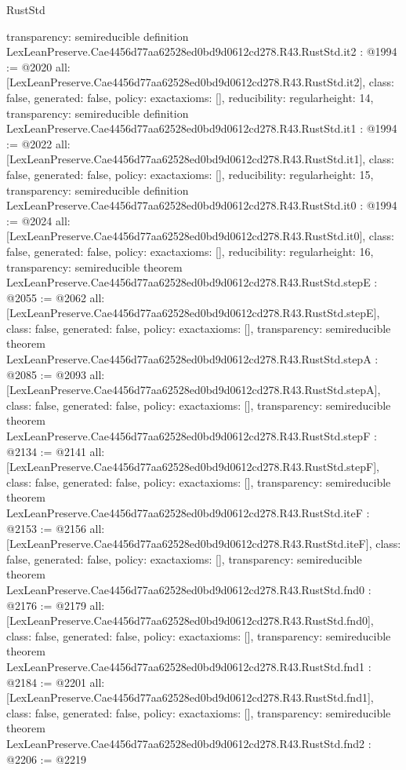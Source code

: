 \begin{lexlean}{RustStd}
\begin{coremodule}
{  transparency: semireducible
}
definition LexLeanPreserve.Cae4456d77aa62528ed0bd9d0612cd278.R43.RustStd.it2 : @1994 := @2020 {
  all: [LexLeanPreserve.Cae4456d77aa62528ed0bd9d0612cd278.R43.RustStd.it2],
  class: false,
  generated: false,
  policy: exact{axioms: []},
  reducibility: regular{height: 14},
  transparency: semireducible
}
definition LexLeanPreserve.Cae4456d77aa62528ed0bd9d0612cd278.R43.RustStd.it1 : @1994 := @2022 {
  all: [LexLeanPreserve.Cae4456d77aa62528ed0bd9d0612cd278.R43.RustStd.it1],
  class: false,
  generated: false,
  policy: exact{axioms: []},
  reducibility: regular{height: 15},
  transparency: semireducible
}
definition LexLeanPreserve.Cae4456d77aa62528ed0bd9d0612cd278.R43.RustStd.it0 : @1994 := @2024 {
  all: [LexLeanPreserve.Cae4456d77aa62528ed0bd9d0612cd278.R43.RustStd.it0],
  class: false,
  generated: false,
  policy: exact{axioms: []},
  reducibility: regular{height: 16},
  transparency: semireducible
}
theorem LexLeanPreserve.Cae4456d77aa62528ed0bd9d0612cd278.R43.RustStd.stepE : @2055 := @2062 {
  all: [LexLeanPreserve.Cae4456d77aa62528ed0bd9d0612cd278.R43.RustStd.stepE],
  class: false,
  generated: false,
  policy: exact{axioms: []},
  transparency: semireducible
}
theorem LexLeanPreserve.Cae4456d77aa62528ed0bd9d0612cd278.R43.RustStd.stepA : @2085 := @2093 {
  all: [LexLeanPreserve.Cae4456d77aa62528ed0bd9d0612cd278.R43.RustStd.stepA],
  class: false,
  generated: false,
  policy: exact{axioms: []},
  transparency: semireducible
}
theorem LexLeanPreserve.Cae4456d77aa62528ed0bd9d0612cd278.R43.RustStd.stepF : @2134 := @2141 {
  all: [LexLeanPreserve.Cae4456d77aa62528ed0bd9d0612cd278.R43.RustStd.stepF],
  class: false,
  generated: false,
  policy: exact{axioms: []},
  transparency: semireducible
}
theorem LexLeanPreserve.Cae4456d77aa62528ed0bd9d0612cd278.R43.RustStd.iteF : @2153 := @2156 {
  all: [LexLeanPreserve.Cae4456d77aa62528ed0bd9d0612cd278.R43.RustStd.iteF],
  class: false,
  generated: false,
  policy: exact{axioms: []},
  transparency: semireducible
}
theorem LexLeanPreserve.Cae4456d77aa62528ed0bd9d0612cd278.R43.RustStd.fnd0 : @2176 := @2179 {
  all: [LexLeanPreserve.Cae4456d77aa62528ed0bd9d0612cd278.R43.RustStd.fnd0],
  class: false,
  generated: false,
  policy: exact{axioms: []},
  transparency: semireducible
}
theorem LexLeanPreserve.Cae4456d77aa62528ed0bd9d0612cd278.R43.RustStd.fnd1 : @2184 := @2201 {
  all: [LexLeanPreserve.Cae4456d77aa62528ed0bd9d0612cd278.R43.RustStd.fnd1],
  class: false,
  generated: false,
  policy: exact{axioms: []},
  transparency: semireducible
}
theorem LexLeanPreserve.Cae4456d77aa62528ed0bd9d0612cd278.R43.RustStd.fnd2 : @2206 := @2219 {
}
\end{coremodule}
\end{lexlean}
